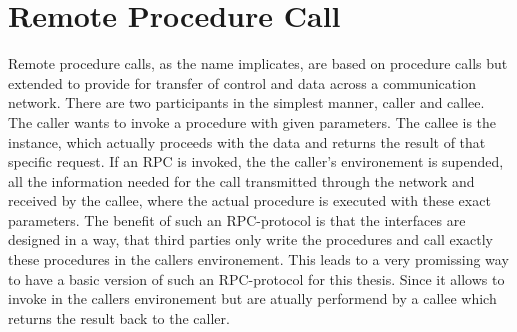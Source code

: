 \section{Remote Procedure Call}
Remote procedure calls, as the name implicates, are based on procedure calls but extended
to provide for transfer of control and data across a communication network. There are
two participants in the simplest manner, caller and callee. The caller wants to invoke a
procedure with given parameters. The callee is the instance, which actually proceeds with
the data and returns the result of that specific request. If an RPC is invoked, the the caller’s
environement is supended, all the information needed for the call transmitted through the
network and received by the callee, where the actual procedure is executed with these exact
parameters. The benefit of such an RPC-protocol is that the interfaces are designed in a
way, that third parties only write the procedures and call exactly these procedures in the
callers environement.\citet[]{birrell1984implementing} This leads to a very promissing way to have a basic version of such
an RPC-protocol for this thesis. Since it allows to invoke in the callers environement but
are atually performend by a callee which returns the result back to the caller.\citet[]{birrell1984implementing}
